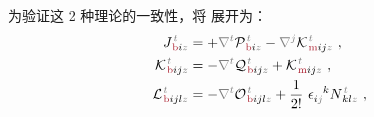 为验证这 2 种理论的一致性，将  展开为：
\begin{subequations} \label{eq:JKL}
\begin{align}
	{J}^{\;\!\mathcolor{gray}{t}}_{\;\!\textcolor{Maroon}{\text{b}} i \mathcolor{gray}{z}} &=+ \mathcolor{gray}{\nabla^t} {\mathcal{P}}^{\;\!\mathcolor{gray}{t}}_{\;\!\textcolor{Maroon}{\text{b}} i \mathcolor{gray}{z}} - \mathcolor{gray}{\nabla^j} {\mathcal{K}}^{\;\!\mathcolor{gray}{t}}_{\;\!\textcolor{Maroon}{\text{m}} ij \mathcolor{gray}{z}}~, \label{eq:Jb} \\
	{\mathcal{K}}^{\;\!\mathcolor{gray}{t}}_{\;\!\textcolor{Maroon}{\text{b}} ij \mathcolor{gray}{z}} &= - \mathcolor{gray}{\nabla^t} {\mathcal{Q}}^{\;\!\mathcolor{gray}{t}}_{\;\!\textcolor{Maroon}{\text{b}} ij \mathcolor{gray}{z}} + {\mathcal{K}}^{\;\!\mathcolor{gray}{t}}_{\;\!\textcolor{Maroon}{\text{m}} ij \mathcolor{gray}{z}}~, \label{eq:Kb} \\
	{\mathcal{L}}^{\;\!\mathcolor{gray}{t}}_{\;\!\textcolor{Maroon}{\text{b}} ijl \mathcolor{gray}{z}} &= - \mathcolor{gray}{\nabla^t} {\mathcal{O}}^{\;\!\mathcolor{gray}{t}}_{\;\!\textcolor{Maroon}{\text{b}} ijl \mathcolor{gray}{z}} + \frac{1}{2!}~ \epsilon^{\hphantom{ij}k}_{i \mathcolor{gray}{j}} N^{\;\!\mathcolor{gray}{t}}_{\;\! kl\mathcolor{gray}{z}}~, \label{eq:Lb}
\end{align}
\end{subequations}
